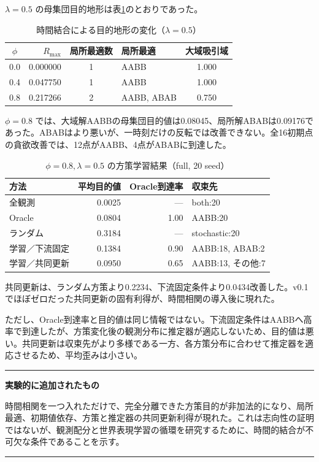 \documentclass[11pt,a4paper]{ltjsarticle}
\newenvironment{takeaway}{\begin{center}\begin{minipage}{0.92\linewidth}\color{Main}\hrule\vspace{6pt}\color{black}}{\vspace{6pt}\color{Main}\hrule\color{black}\end{minipage}\end{center}}
\begin{document}
$\lambda=0.5$ の母集団目的地形は表\ref{tab:landscape}のとおりであった。

\begin{table}[ht]
\centering
\caption{時間結合による目的地形の変化（$\lambda=0.5$）}
\label{tab:landscape}
\begin{tabular}{crclc}
\toprule
$\phi$ & $R_{\max}$ & 局所最適数 & 局所最適 & 大域吸引域 \\
\midrule
0.0 & 0.000000 & 1 & AABB & 1.000 \\
0.4 & 0.047750 & 1 & AABB & 1.000 \\
0.8 & 0.217266 & 2 & AABB, ABAB & 0.750 \\
\bottomrule
\end{tabular}
\end{table}

$\phi=0.8$ では、大域解AABBの母集団目的値は0.08045、局所解ABABは0.09176であった。ABABはより悪いが、一時刻だけの反転では改善できない。全16初期点の貪欲改善では、12点がAABB、4点がABABに到達した。

\begin{table}[ht]
\centering
\caption{$\phi=0.8,\lambda=0.5$ の方策学習結果（full, 20 seed）}
\begin{tabular}{lrrl}
\toprule
方法 & 平均目的値 & Oracle到達率 & 収束先 \\
\midrule
全観測 & 0.0025 & --- & both:20 \\
Oracle & 0.0804 & 1.00 & AABB:20 \\
ランダム & 0.3184 & --- & stochastic:20 \\
学習／下流固定 & 0.1384 & 0.90 & AABB:18, ABAB:2 \\
学習／共同更新 & 0.0950 & 0.65 & AABB:13, その他:7 \\
\bottomrule
\end{tabular}
\end{table}

共同更新は、ランダム方策より0.2234、下流固定条件より0.0434改善した。v0.1でほぼゼロだった共同更新の固有利得が、時間相関の導入後に現れた。

ただし、Oracle到達率と目的値は同じ情報ではない。下流固定条件はAABBへ高率で到達したが、方策変化後の観測分布に推定器が適応しないため、目的値は悪い。共同更新は収束先がより多様である一方、各方策分布に合わせて推定器を適応させるため、平均歪みは小さい。

\begin{takeaway}
\textbf{実験的に追加されたもの}

時間相関を一つ入れただけで、完全分離できた方策目的が非加法的になり、局所最適、初期値依存、方策と推定器の共同更新利得が現れた。これは志向性の証明ではないが、観測配分と世界表現学習の循環を研究するために、時間的結合が不可欠な条件であることを示す。
\end{takeaway}
\end{document}
